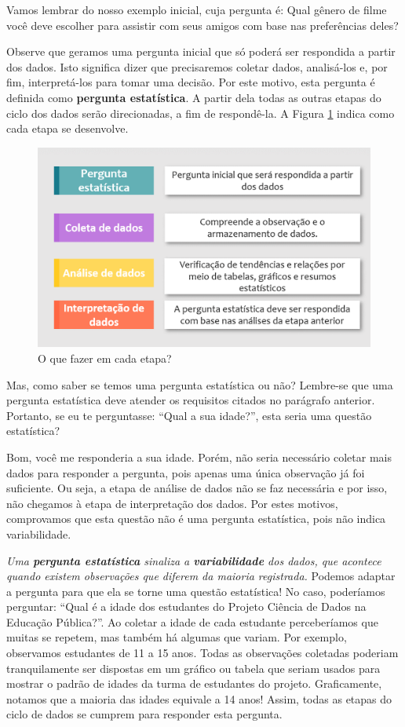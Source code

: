 \documentclass[
  portuguese,
  oneside]{book}
\begin{document}
Vamos lembrar do nosso exemplo inicial, cuja pergunta é: Qual gênero de filme você deve escolher para assistir com seus amigos com base nas preferências deles?

Observe que geramos uma pergunta inicial que só poderá ser respondida a partir dos dados. Isto significa dizer que precisaremos coletar dados, analisá-los e, por fim, interpretá-los para tomar uma decisão. Por este motivo, esta pergunta é definida como \textbf{pergunta estatística}. A partir dela todas as outras etapas do ciclo dos dados serão direcionadas, a fim de respondê-la. A Figura \ref{fig:figura6} indica como cada etapa se desenvolve.

\begin{figure}

{\centering \includegraphics[width=0.8\linewidth]{fig_cap1/Imagemetapas} 

}

\caption{O que fazer em cada etapa?}\label{fig:figura6}
\end{figure}

Mas, como saber se temos uma pergunta estatística ou não? Lembre-se que uma pergunta estatística deve atender os requisitos citados no parágrafo anterior. Portanto, se eu te perguntasse: ``Qual a sua idade?'', esta seria uma questão estatística?

Bom, você me responderia a sua idade. Porém, não seria necessário coletar mais dados para responder a pergunta, pois apenas uma única observação já foi suficiente. Ou seja, a etapa de análise de dados não se faz necessária e por isso, não chegamos à etapa de interpretação dos dados. Por estes motivos, comprovamos que esta questão não é uma pergunta estatística, pois não indica variabilidade.

\emph{Uma \textbf{pergunta estatística} sinaliza a \textbf{variabilidade} dos dados, que acontece quando existem observações que diferem da maioria registrada.}
Podemos adaptar a pergunta para que ela se torne uma questão estatística! No caso, poderíamos perguntar: ``Qual é a idade dos estudantes do Projeto Ciência de Dados na Educação Pública?''. Ao coletar a idade de cada estudante perceberíamos que muitas se repetem, mas também há algumas que variam. Por exemplo, observamos estudantes de 11 a 15 anos. Todas as observações coletadas poderiam tranquilamente ser dispostas em um gráfico ou tabela que seriam usados para mostrar o padrão de idades da turma de estudantes do projeto. Graficamente, notamos que a maioria das idades equivale a 14 anos! Assim, todas as etapas do ciclo de dados se cumprem para responder esta pergunta.
\end{document}

